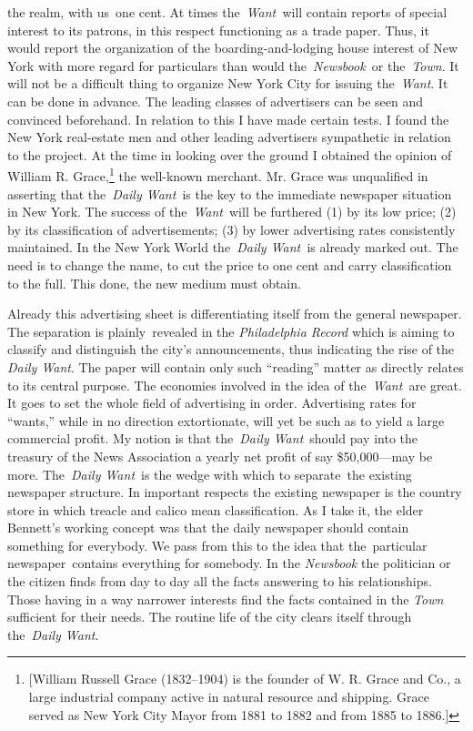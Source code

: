 \documentclass[twoside,symmetric,nobib,justified]{tufte-book}
\begin{document}
the realm, with us~one cent. At times the~\emph{Want~}will contain
reports of special interest to its patrons, in this respect functioning
as a trade paper. Thus, it would report the organization of the
boarding-and-lodging house interest of New York with more regard for
particulars than would the~\emph{Newsbook~}or the~\emph{Town}. It will
not be a difficult thing to organize New York City for issuing
the~\emph{Want}. It can be done in advance. The leading classes of
advertisers can be seen and convinced beforehand. In relation to this I
have made certain tests. I found the New York real-estate men and other
leading advertisers sympathetic in relation to the project. At the time
in looking over the ground I obtained the opinion of William R.
Grace,\footnote{{[}William Russell Grace (1832--1904) is the founder of
  W. R. Grace and Co., a large industrial company active in natural
  resource and shipping. Grace served as New York City Mayor from 1881
  to 1882 and from 1885 to 1886.{]}} the well-known merchant. Mr. Grace
was unqualified in asserting that the~\emph{Daily Want~}is the key to
the immediate newspaper situation in New York. The success of
the~\emph{Want}~will be furthered (1) by its low price; (2) by its
classification of advertisements; (3) by lower advertising rates
consistently maintained. In the New York World the\emph{~Daily Want~}is
already marked out. The need is to change the name, to cut the price to
one cent and carry classification to the full. This done, the new medium
must obtain.~

Already this advertising sheet is differentiating itself from the
general newspaper. The separation is plainly~revealed in the
\emph{Philadelphia Record} which is aiming to classify and distinguish
the city's announcements, thus indicating the rise of the \emph{Daily
Want}. The paper will contain only such ``reading'' matter as directly
relates to its central purpose. The economies involved in the idea of
the\emph{~Want~}are great. It goes to set the whole field of advertising
in order. Advertising rates for ``wants,'' while in no direction
extortionate, will yet be such as to yield a large commercial profit. My
notion is that the~\emph{Daily Want}~should pay into the treasury of the
News Association a yearly net profit of say \$50,000---may be more.
The~\emph{Daily Want}~is the wedge with which to separate~the existing
newspaper structure. In important respects the existing newspaper is the
country store in which treacle and calico mean classification. As I take
it, the elder Bennett's working concept was that the daily newspaper
should contain something for everybody. We pass from this to the idea
that the~particular newspaper~contains everything for somebody. In the
\emph{Newsbook} the politician or the citizen finds from day to day all
the facts answering to his relationships. Those having in a way narrower
interests find the facts contained in the \emph{Town} sufficient for
their needs. The routine life of the city clears itself through
the~\emph{Daily Want}.~
\end{document}
